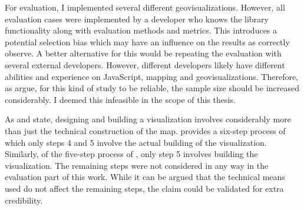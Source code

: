 For evaluation, I implemented several different geovisualizations. However, all evaluation cases were implemented by a developer who knows the library functionality along with evaluation methods and metrics. This introduces a potential selection bias which may have an influence on the results as \citet{kitchenham_evaluating_1998} correctly observe. A better alternative for this would be repeating the evaluation with several external developers. However, different developers likely have different abilities and experience on JavaScript, mapping and geovisualizations. Therefore, as \citet{mohagheghi_quality_2007} argue, for this kind of study to be reliable, the sample size should be increased considerably. I deemed this infeasible in the scope of this thesis.

As \citet{schlichtmann_visualization_2002} and \citet{slocum_thematic_2014} state, designing and building a visualization involves considerably more than just the technical construction of the map. \citeauthor{schlichtmann_visualization_2002} provides a six-step process of which only steps 4 and 5 involve the actual building of the visualization. Similarly, of the five-step process of \citeauthor{slocum_thematic_2014}, only step 5 involves building the visualization. The remaining steps were not considered in any way in the evaluation part of this work. While it can be argued that the technical means used do not affect the remaining steps, the claim could be validated for extra credibility.

